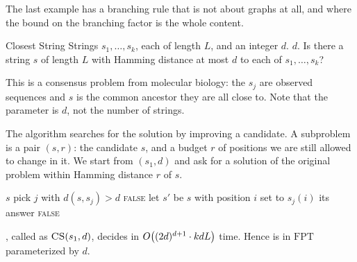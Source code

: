 The last example has a branching rule that is not about graphs at all, and where
the bound on the branching factor is the whole content.

\begin{probdef}{Closest String}
  \instance Strings $s_1, \ldots, s_k$, each of length $L$, and an integer $d$.
  \parameter $d$.
  \question Is there a string $s$ of length $L$ with Hamming distance at most
  $d$ to each of $s_1, \ldots, s_k$?
\end{probdef}

This is a consensus problem from molecular biology: the $s_j$ are observed
sequences and $s$ is the common ancestor they are all close to. Note that the
parameter is $d$, not the number of strings.

The algorithm searches for the solution by improving a candidate. A subproblem
is a pair $(s, r)$: the candidate $s$, and a budget $r$ of positions we are
still allowed to change in it. We start from $(s_1, d)$ and ask for a solution
of the original problem within Hamming distance $r$ of $s$.

\begin{algorithm}[ht]
\caption{Branching for }
\label{alg:fpt-closest-string}
\begin{algorithmic}[1]
     \Return $s$ \EndIf
    \State pick $j$ with $d(s,s_j) > d$
     \Return \textsc{false} \EndIf
      \State let $s'$ be $s$ with position $i$ set to $s_j(i)$
       \Return its answer \EndIf
    \EndFor
    \State \Return \textsc{false}
  \EndFunction
\end{algorithmic}
\end{algorithm}

\begin{theorem}\label{thm:fpt-closest-string}
, called as $\textsc{CS}(s_1, d)$, decides
 in $O\!\left((2d)^{d+1} \cdot kdL\right)$ time. Hence
 is in $\mathrm{FPT}$ parameterized by $d$.
\end{theorem}

